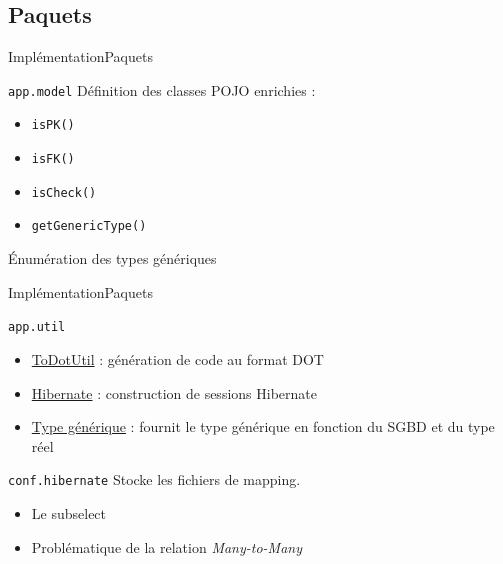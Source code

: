 \subsection{Paquets}
\begin{frame}{Implémentation}{Paquets}
	\begin{block}{\texttt{app.model}}
	Définition des classes POJO enrichies :
	\begin{itemize}
	\item \texttt{isPK()}
	\item \texttt{isFK()}
	\item \texttt{isCheck()}
	\item \texttt{getGenericType()}
	\end{itemize}
	Énumération des types génériques
	\end{block}
\end{frame}

\begin{frame}{Implémentation}{Paquets}
	\begin{block}{\texttt{app.util}}
	\begin{itemize}
		\item \underline{ToDotUtil} : génération de code au format DOT
		\item \underline{Hibernate} : construction de sessions Hibernate
		\item \underline{Type générique} : fournit le type générique en fonction du SGBD et du type réel
	\end{itemize}
	\end{block}
	
	\begin{block}{\texttt{conf.hibernate}}
	Stocke les fichiers de mapping.
	\begin{itemize}
		\item Le subselect
		\item Problématique de la relation \textit{Many-to-Many}
	\end{itemize}
	\end{block}
\end{frame}


